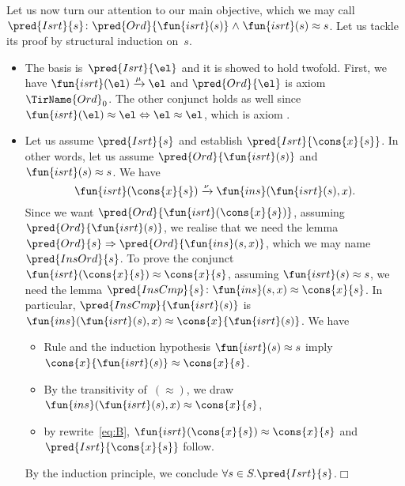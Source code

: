 Let us now turn our attention to our main objective, which we may call
\(\pred{Isrt}{s}\colon \pred{Ord}{\fun{isrt}(s)} \mathrel{\wedge}
\fun{isrt}(s) \approx s\). Let us tackle
its proof by structural induction on~\(s\).
\begin{itemize}

  \item The basis is~\(\pred{Isrt}{\el}\) and it is showed to hold
    twofold. First, we have \(\fun{isrt}(\el)
    \xrightarrow{\smash{\mu}} \el\) and \(\pred{Ord}{\el}\) is axiom
    \(\TirName{Ord}_0\). The other conjunct holds as well since
    \(\fun{isrt}(\el) \approx \el \Leftrightarrow \el \approx \el\),
    which is axiom .

  \item Let us assume \(\pred{Isrt}{s}\) and establish
    \(\pred{Isrt}{\cons{x}{s}}\). In other words, let us assume
    \(\pred{Ord}{\fun{isrt}(s)}\) and \(\fun{isrt}(s) \approx s\). We
    have
    \begin{equation}
      \fun{isrt}(\cons{x}{s}) \xrightarrow{\smash{\nu}}
      \fun{ins}(\fun{isrt}(s),x).\label{eq:B}
    \end{equation}
    Since we want \(\pred{Ord}{\fun{isrt}(\cons{x}{s})}\), assuming
    \(\pred{Ord}{\fun{isrt}(s)}\), we realise that we need the lemma
    \(\pred{Ord}{s} \Rightarrow \pred{Ord}{\fun{ins}(s,x)}\), which we
    may name \(\pred{InsOrd}{s}\). To
    prove the conjunct \(\fun{isrt}(\cons{x}{s}) \approx
    \cons{x}{s}\), assuming \(\fun{isrt}(s) \approx s\), we need the
    lemma \(\pred{InsCmp}{s} \colon \fun{ins}(s,x) \approx
    \cons{x}{s}\). In particular, \(\pred{InsCmp}{\fun{isrt}(s)}\) is
    \(\fun{ins}(\fun{isrt}(s),x) \approx \cons{x}{\fun{isrt}(s)}\). We
    have
    \begin{itemize}

      \item Rule  and the induction hypothesis
        \(\fun{isrt}(s) \approx s\) imply \(\cons{x}{\fun{isrt}(s)}
        \approx \cons{x}{s}\).

      \item By the transitivity of~\((\approx)\), we draw
        \(\fun{ins}(\fun{isrt}(s),x) \approx \cons{x}{s}\),

      \item by rewrite~\eqref{eq:B}, \(\fun{isrt}(\cons{x}{s})
        \approx \cons{x}{s}\) and \(\pred{Isrt}{\cons{x}{s}}\)
        follow.

    \end{itemize}
    By the induction principle, we conclude \(\forall s \in
    S.\pred{Isrt}{s}\).\hfill\(\Box\)

\end{itemize}

